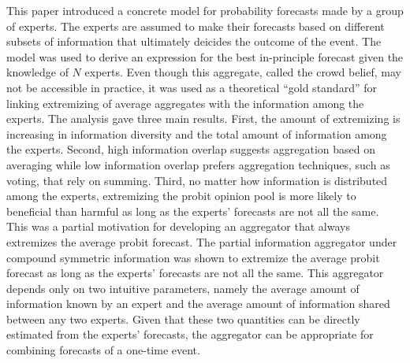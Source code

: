 \documentclass[11pt]{article}
\theoremstyle{definition}
\theoremstyle{definition}
\begin{document}



This paper introduced a concrete model for probability forecasts made by a group of experts. The experts are assumed to make their forecasts based on different subsets of information that ultimately deicides the outcome of the event. The model was used to derive an expression for the best in-principle forecast given the knowledge of $N$ experts. Even though this aggregate, called the crowd belief, may not be accessible in practice, it was used as a theoretical ``gold standard'' for linking extremizing of average aggregates with the information among the experts. The analysis gave three main results. First, the amount of extremizing is increasing in information diversity and the total amount of information among the experts. Second, high information overlap suggests aggregation based on averaging while low information overlap prefers aggregation techniques, such as voting, that rely on summing. Third, no matter how information is distributed among the experts, extremizing the probit opinion pool is more likely to beneficial than harmful as long as the experts' forecasts are not all the same. This was a partial motivation for developing an aggregator that always extremizes the average probit forecast. The partial information aggregator under compound symmetric information was shown to extremize the average probit forecast as long as the experts' forecasts are not all the same. This aggregator depends only on two intuitive parameters, namely the average amount of information known by an expert and the average amount of information shared between any two experts. Given that these two quantities can be directly estimated from the experts' forecasts, the aggregator can be appropriate for combining forecasts of a one-time event. 
\end{document}
